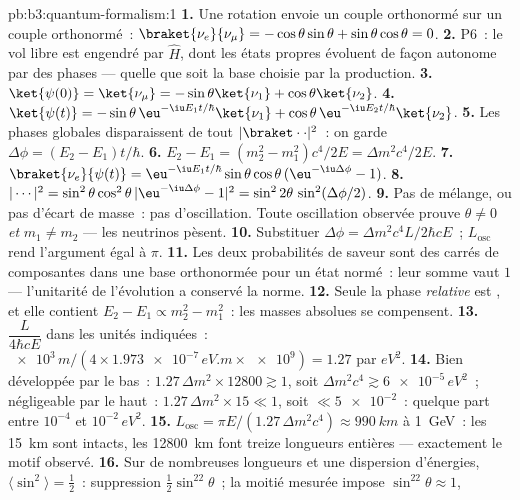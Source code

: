 \begin{solution}{pb:b3:quantum-formalism:1}
\textbf{1.} Une rotation envoie un couple orthonormé sur un couple
orthonormé~: $\braket{\nu_e}{\nu_\mu} = -\cos\theta\sin\theta +
\sin\theta\cos\theta = 0$.
\textbf{2.} P6~: le vol libre est engendré par $\hat H$, dont les
états propres évoluent de façon autonome par des phases --- quelle que
soit la base choisie par la production.
\textbf{3.} $\ket{\psi(0)} = \ket{\nu_\mu} = -\sin\theta\ket{\nu_1}
+ \cos\theta\ket{\nu_2}$.
\textbf{4.} $\ket{\psi(t)} = -\sin\theta\,\eu^{-\iu E_1t/\hbar}
\ket{\nu_1} + \cos\theta\,\eu^{-\iu E_2t/\hbar}\ket{\nu_2}$.
\textbf{5.} Les phases globales disparaissent de tout
$|\braket\cdot\cdot|^2$~: on garde $\Delta\phi = (E_2 - E_1)t/\hbar$.
\textbf{6.} $E_2 - E_1 = (m_2^2 - m_1^2)c^4/2E = \Delta m^2c^4/2E$.
\textbf{7.} $\braket{\nu_e}{\psi(t)} = \eu^{-\iu E_1t/\hbar}
\sin\theta\cos\theta\,(\eu^{-\iu\Delta\phi} - 1)$.
\textbf{8.} $|\cdots|^2 = \sin^2\theta\cos^2\theta\,|{\eu^{-\iu
\Delta\phi} - 1}|^2 = \sin^22\theta\,\sin^2(\Delta\phi/2)$.
\textbf{9.} Pas de mélange, ou pas d'écart de masse~: pas
d'oscillation. Toute oscillation observée prouve $\theta \neq 0$
\emph{et} $m_1 \neq
m_2$ --- les neutrinos pèsent.
\textbf{10.} Substituer $\Delta\phi = \Delta m^2c^4L/2\hbar cE$~;
$L_{\text{osc}}$ rend l'argument égal à $\pi$.
\textbf{11.} Les deux probabilités de saveur sont des carrés de
composantes dans une base orthonormée pour un état normé~: leur somme
vaut $1$ --- l'unitarité de l'évolution a conservé la norme.
\textbf{12.} Seule la phase \emph{relative} est , et elle
contient $E_2 - E_1 \propto m_2^2 - m_1^2$~: les masses absolues se
compensent.
\textbf{13.} $\dfrac{L}{4\hbar cE}$ dans les unités indiquées~:
$\num{e3}\,\unit{m}/(4 \times \num{1.973e-7}\,\unit{eV.m} \times
\num{e9}) = 1.27$ par $\unit{eV^2}$.
\textbf{14.} Bien développée par le bas~: $1.27\,\Delta m^2 \times 12800
\gtrsim 1$, soit $\Delta m^2c^4 \gtrsim \num{6e-5}\,\unit{eV^2}$~;
négligeable par le haut~: $1.27\,\Delta m^2 \times 15 \ll 1$, soit $\ll
\num{5e-2}$~: quelque part entre $10^{-4}$ et $10^{-2}\,\unit{eV^2}$.
\textbf{15.} $L_{\text{osc}} = \pi E/(1.27\,\Delta m^2c^4) \approx
\qty{990}{km}$ à \qty{1}{GeV}~: les \qty{15}{km} sont intacts, les
\qty{12800}{km} font treize longueurs entières --- exactement le motif
observé.
\textbf{16.} Sur de nombreuses longueurs et une dispersion d'énergies,
$\langle\sin^2\rangle = \tfrac12$~: suppression $\tfrac12\sin^22
\theta$~; la moitié mesurée impose $\sin^22\theta \approx 1$,

\end{solution}
